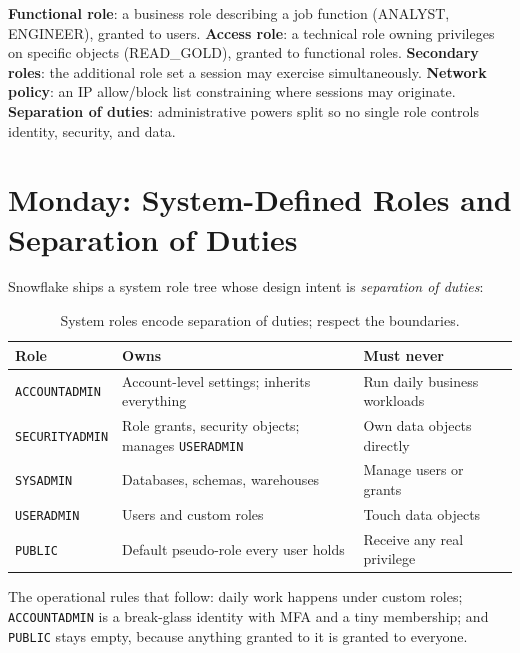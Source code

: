 \begin{keyterms}
\textbf{Functional role}: a business role describing a job function (ANALYST, ENGINEER), granted to users.\quad
\textbf{Access role}: a technical role owning privileges on specific objects (READ\_GOLD), granted to functional roles.\quad
\textbf{Secondary roles}: the additional role set a session may exercise simultaneously.\quad
\textbf{Network policy}: an IP allow/block list constraining where sessions may originate.\quad
\textbf{Separation of duties}: administrative powers split so no single role controls identity, security, and data.
\end{keyterms}

\section{Monday: System-Defined Roles and Separation of Duties}
Snowflake ships a system role tree whose design intent is \emph{separation of duties}:

\begin{table}[H]
\centering
\small
\begin{tabular}{@{}p{3.4cm}p{5.4cm}p{4.6cm}@{}}
\toprule
\textbf{Role} & \textbf{Owns} & \textbf{Must never} \\
\midrule
\texttt{ACCOUNTADMIN} & Account-level settings; inherits everything & Run daily business workloads \\
\texttt{SECURITYADMIN} & Role grants, security objects; manages \texttt{USERADMIN} & Own data objects directly \\
\texttt{SYSADMIN} & Databases, schemas, warehouses & Manage users or grants \\
\texttt{USERADMIN} & Users and custom roles & Touch data objects \\
\texttt{PUBLIC} & Default pseudo-role every user holds & Receive any real privilege \\
\bottomrule
\end{tabular}
\caption{System roles encode separation of duties; respect the boundaries.}
\label{tab:chapter17-system-roles}
\end{table}

The operational rules that follow: daily work happens under custom roles; \texttt{ACCOUNTADMIN} is a break-glass identity with MFA and a tiny membership; and \texttt{PUBLIC} stays empty, because anything granted to it is granted to everyone.

